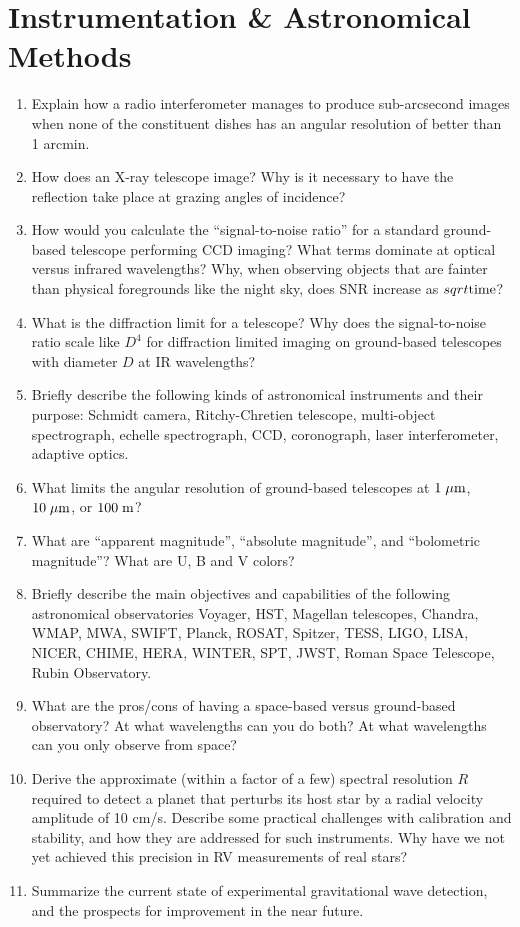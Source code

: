 \documentclass[10pt, oneside]{book}
\begin{document}
\section{Instrumentation \& Astronomical Methods}

\begin{enumerate}[start=153]
    \item Explain how a radio interferometer manages to produce sub-arcsecond images when none of the constituent dishes has an angular resolution of better than 1 arcmin.
    \item How does an X-ray telescope image? Why is it necessary to have the reflection take place at grazing angles of incidence?
    \item How would you calculate the ``signal-to-noise ratio'' for a standard ground-based telescope performing CCD imaging? What terms dominate at optical versus infrared wavelengths? Why, when observing objects that are fainter than physical foregrounds like the night sky, does SNR increase as $sqrt{\rm time}$?
    \item What is the diffraction limit for a telescope? Why does the signal-to-noise ratio scale like $D^{4}$ for diffraction limited imaging on ground-based telescopes with diameter $D$ at IR wavelengths?
    \item Briefly describe the following kinds of astronomical instruments and their purpose: Schmidt camera, Ritchy-Chretien telescope, multi-object spectrograph, echelle spectrograph, CCD, coronograph, laser interferometer, adaptive optics.
    \item What limits the angular resolution of ground-based telescopes at $1 \; {\rm \mu m}$, $10 \; {\rm \mu m}$, or $100 \; {\rm m}$?
    \item What are ``apparent magnitude'', ``absolute magnitude'', and ``bolometric magnitude''? What are U, B and V colors?
    \item Briefly describe the main objectives and capabilities of the following astronomical observatories Voyager, HST, Magellan telescopes, Chandra, WMAP, MWA, SWIFT, Planck, ROSAT, Spitzer, TESS, LIGO, LISA, NICER, CHIME, HERA, WINTER, SPT, JWST, Roman Space Telescope, Rubin Observatory.
    \item What are the pros/cons of having a space-based versus ground-based observatory? At what wavelengths can you do both? At what wavelengths can you only observe from space?
    \item Derive the approximate (within a factor of a few) spectral resolution $R$ required to detect a planet that perturbs its host star by a radial velocity amplitude of 10 cm/s. Describe some practical challenges with calibration and stability, and how they are addressed for such instruments. Why have we not yet achieved this precision in RV measurements of real stars?
    \item Summarize the current state of experimental gravitational wave detection, and the prospects for improvement in the near future.
\end{enumerate}
\end{document}
